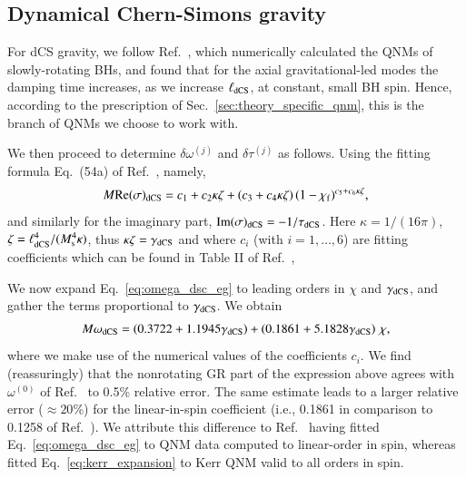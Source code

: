 \documentclass[twocolumn,
               prd,
               aps,
               superscriptaddress,
               tightenlines,
               nofootinbib,
               eqsecnum,
               amsfonts,
               amsmath,
               longbibliography]{revtex4-1}
\begin{document}
\subsection{Dynamical Chern-Simons gravity}
\label{app:map_dcs}

For dCS gravity, we follow Ref.~\cite{Wagle:2021tam}, which numerically calculated the QNMs
of slowly-rotating BHs, and found that for the axial gravitational-led modes the damping time increases, as we
increase $\ell_{\rm dCS}$, at constant, small BH spin.
%
Hence, according to the prescription of Sec.~\ref{sec:theory_specific_qnm},
this is the branch of QNMs we choose to work with.

We then proceed to determine $\delta\omega^{(j)}$ and $\delta\tau^{(j)}$ as follows.
%
Using the fitting formula Eq.~(54a) of Ref.~\cite{Wagle:2021tam}, namely,
%
\begin{equation}
    M {\rm Re}(\sigma)_{\rm dCS} = c_{1} + c_{2} \kappa \zeta + (c_{3} + c_{4} \kappa \zeta) \, (1 - \chi_{\rm f})^{c_{5} + c_{6} \kappa \zeta},
    \label{eq:omega_dsc_eg}
\end{equation}
%
and similarly for the imaginary part, ${\rm Im}(\sigma)_{\rm dCS} =  - 1 / \tau_{\rm dCS}$.
%
Here $\kappa = 1/(16 \pi)$, $\zeta = \ell_{\rm dCS}^{4} / (M_{\rm s}^4 \kappa)$, thus
$\kappa \zeta = \gamma_{\rm dCS}$ and
where $c_{i}$ (with $i=1, \dots, 6$) are fitting coefficients which can be found in
Table II of Ref.~\cite{Wagle:2021tam},

We now expand Eq.~\eqref{eq:omega_dsc_eg} to leading orders in $\chi$ and $\gamma_{\rm dCS}$, and
gather the terms proportional to $\gamma_{\rm dCS}$.
%
We obtain
%
\begin{align}
    M \omega_{\rm dCS} =
    \left( 0.3722 + 1.1945 \gamma_{\rm dCS} \right)
    + \left(0.1861 + 5.1828 \gamma_{\rm dCS} \right) \, \chi,
    \nonumber \\
    \label{eq:omega_dcs_interm}
\end{align}
%
where we make use of the numerical values of the coefficients $c_{i}$.
%
We find (reassuringly) that the nonrotating GR part of the expression above agrees with $\omega^{(0)}$ of Ref.~\cite{Maselli:2019mjd} to 0.5\% relative error. The same estimate leads to a larger relative error ($\approx 20$\%) for the linear-in-spin coefficient (i.e., 0.1861 in comparison to 0.1258 of Ref.~\cite{Maselli:2019mjd}).
%
We attribute this difference to Ref.~\cite{Wagle:2021tam} having fitted
Eq.~\eqref{eq:omega_dsc_eg} to QNM data computed to linear-order in spin,
whereas~\cite{Maselli:2019mjd} fitted Eq.~\eqref{eq:kerr_expansion} to Kerr QNM
valid to all orders in spin.
\end{document}
